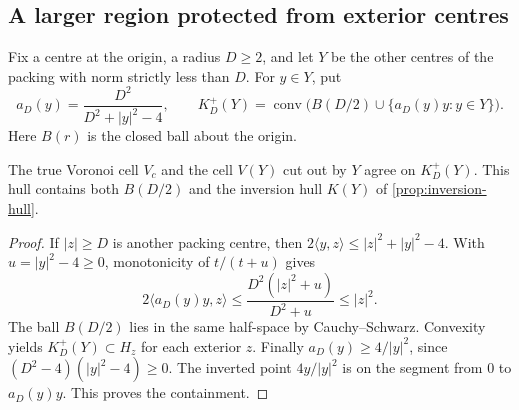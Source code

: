 \subsection{A larger region protected from exterior centres}
\label{sec:protected-shell}

Fix a centre at the origin, a radius $D\ge2$, and let $Y$ be the
other centres of the packing with norm strictly less than $D$.
For $y\in Y$, put
\[
 a_D(y)=\frac{D^2}{D^2+|y|^2-4},\qquad
 K_D^+(Y)=\operatorname{conv}\bigl(B(D/2)\cup
                       \{a_D(y)y:y\in Y\}\bigr).
\]
Here $B(r)$ is the closed ball about the origin.

\begin{prop}\label{prop:protected-shell}
The true Voronoi cell $V_c$ and the cell $V(Y)$ cut out by $Y$
agree on $K_D^+(Y)$. This hull contains both $B(D/2)$ and the
inversion hull $K(Y)$ of \cref{prop:inversion-hull}.
\end{prop}
\begin{proof}
If $|z|\ge D$ is another packing centre, then
$2\langle y,z\rangle\le |z|^2+|y|^2-4$. With $u=|y|^2-4\ge0$,
monotonicity of $t/(t+u)$ gives
\[
 2\langle a_D(y)y,z\rangle
 \le\frac{D^2(|z|^2+u)}{D^2+u}\le |z|^2.
\]
The ball $B(D/2)$ lies in the same half-space by Cauchy--Schwarz.
Convexity yields $K_D^+(Y)\subset H_z$ for each exterior $z$.
Finally $a_D(y)\ge4/|y|^2$, since $(D^2-4)(|y|^2-4)\ge0$.
The inverted point $4y/|y|^2$ is on the segment from $0$ to
$a_D(y)y$. This proves the containment.
\end{proof}

